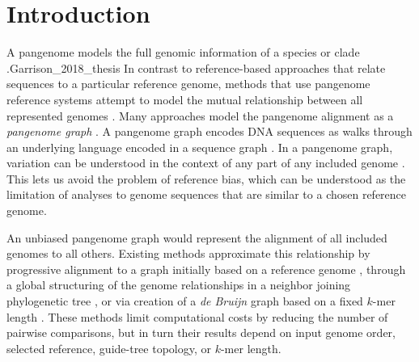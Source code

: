 \documentclass{bioinfo}
\theoremstyle{definition}
\begin{document}
\maketitle


\section{Introduction}
\label{sec:introduction}
A pangenome models the full genomic information of a species or clade \citep{Medini_2005,Sherman_2020}.Garrison_2018_thesis
In contrast to reference-based approaches that relate sequences to a particular reference genome, methods that use pangenome reference systems attempt to model the mutual relationship between all represented genomes \citep{cpang2018}.
Many approaches model the pangenome alignment as a \textit{pangenome graph} \citep{Garrison_2018,Yokoyama2019,Hickey:2020}.
A pangenome graph encodes DNA sequences as walks through an underlying language encoded in a sequence graph \citep{Hein_1989}.
In a pangenome graph, variation can be understood in the context of any part of any included genome  \citep{Eizenga_2020}.
This lets us avoid the problem of reference bias, which can be understood as the limitation of analyses to genome sequences that are similar to a chosen reference genome.

An unbiased pangenome graph would represent the alignment of all included genomes to all others.
Existing methods approximate this relationship by progressive alignment to a graph initially based on a reference genome \citep{Li:2020}, through a global structuring of the genome relationships in a neighbor joining phylogenetic tree \citep{Armstrong:2020}, or via creation of a \textit{de Bruijn} graph based on a fixed $k$-mer length \citep{Minkin_2016,Sheikhizadeh_2016,Yu_2021}.
These methods limit computational costs by reducing the number of pairwise comparisons, but in turn their results depend on input genome order, selected reference, guide-tree topology, or $k$-mer length.
\end{document}
